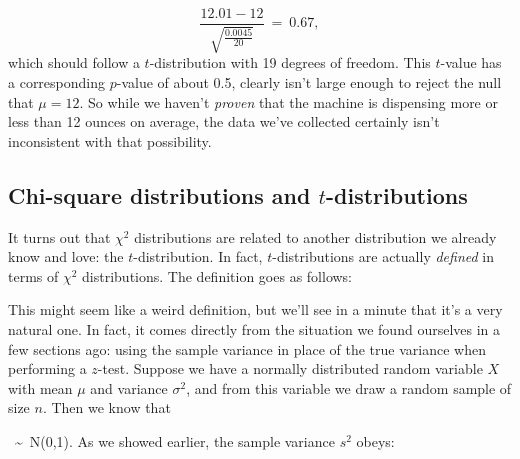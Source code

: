 \begin{equation*}
\frac{12.01 - 12}{\sqrt{\frac{0.0045}{20}}}\ = \ 0.67,
\end{equation*}
which should follow a $t$-distribution with 19 degrees of freedom.  This $t$-value has a corresponding $p$-value of about 0.5, clearly isn't large enough to reject the null that $\mu = 12$.  So while we haven't \emph{proven} that the machine is dispensing more or less than 12 ounces on average, the data we've collected certainly isn't inconsistent with that possibility.

\subsection{Chi-square distributions and $t$-distributions}

It turns out that $\chi^2$ distributions are related to another distribution we already know and love: the $t$-distribution.  In fact, $t$-distributions are actually \emph{defined} in terms of $\chi^2$ distributions.  The definition goes as follows:

\begin{table}[h]
\begin{center}
\end{center}
\end{table}

This might seem like a weird definition, but we'll see in a minute that it's a very natural one.  In fact, it comes directly from the situation we found ourselves in a few sections ago: using the sample variance in place of the true variance when performing a $z$-test.  Suppose we have a normally distributed random variable $X$ with mean $\mu$ and variance $\sigma^2$, and from this variable we draw a random sample of size $n$.  Then we know that

\bel
{}\ \sim \ N(0,1).
\eel
As we showed earlier, the sample variance $s^2$ obeys:


